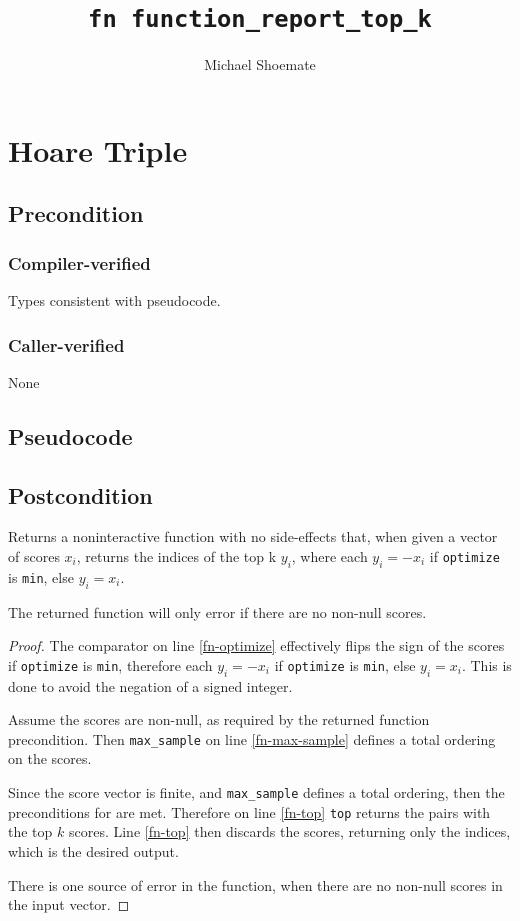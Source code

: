 \documentclass{article}
\title{\texttt{fn function\_report\_top\_k}}
\author{Michael Shoemate}
\begin{document}
  
\maketitle 
 
\section{Hoare Triple} 
\subsection*{Precondition} 
\subsubsection*{Compiler-verified}
Types consistent with pseudocode.

\subsubsection*{Caller-verified}
None
 
\subsection*{Pseudocode}
 
 
\subsection*{Postcondition} 

\begin{theorem}
    Returns a noninteractive function with no side-effects that, when given a vector of scores $x_i$,
    returns the indices of the top k $y_i$,
    where each $y_i = -x_i$ if \texttt{optimize} is \texttt{min}, else $y_i = x_i$.

    The returned function will only error if there are no non-null scores.
\end{theorem}

\begin{proof}
    The comparator on line \ref{fn-optimize} effectively flips the sign of the scores if \texttt{optimize} is \texttt{min},
    therefore each $y_i = -x_i$ if \texttt{optimize} is \texttt{min}, else $y_i = x_i$.
    This is done to avoid the negation of a signed integer.

    Assume the scores are non-null, as required by the returned function precondition.
    Then \texttt{max\_sample} on line \ref{fn-max-sample} defines a total ordering on the scores.

    Since the score vector is finite, and \texttt{max\_sample} defines a total ordering,
    then the preconditions for  are met.
    Therefore on line \ref{fn-top} \texttt{top} returns the pairs with the top $k$ scores.
    Line \ref{fn-top} then discards the scores, returning only the indices,
    which is the desired output.

    There is one source of error in the function,
    when there are no non-null scores in the input vector.
\end{proof}
 
\end{document}
